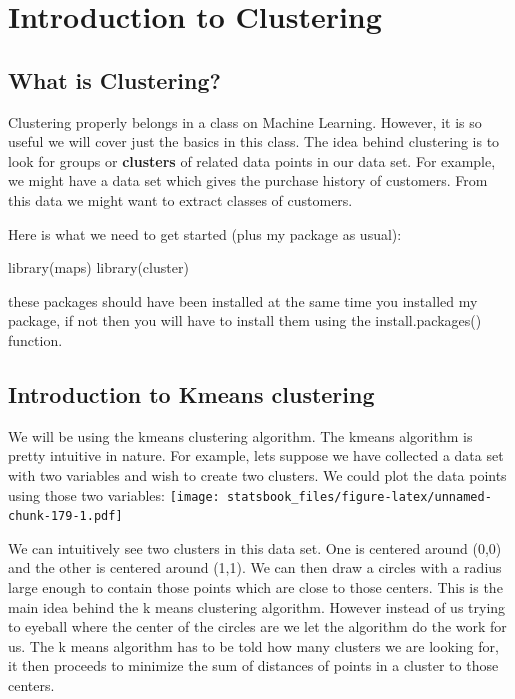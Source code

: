 \documentclass[
]{book}
\newenvironment{Shaded}{\begin{snugshade}}{\end{snugshade}}
\newcommand{\FunctionTok}[1]{\textcolor[rgb]{0.00,0.00,0.00}{#1}}
\newcommand{\NormalTok}[1]{#1}
\theoremstyle{definition}
\theoremstyle{definition}
\theoremstyle{definition}
\theoremstyle{definition}
\theoremstyle{remark}
\begin{document}
\hypertarget{introduction-to-clustering}{%
\chapter{Introduction to Clustering}\label{introduction-to-clustering}}

\hypertarget{what-is-clustering}{%
\section{What is Clustering?}\label{what-is-clustering}}

Clustering properly belongs in a class on Machine Learning. However, it is so useful we will cover just the basics in this class. The idea behind clustering is to look for groups or \textbf{clusters} of related data points in our data set. For example, we might have a data set which gives the purchase history of customers. From this data we might want to extract classes of customers.

Here is what we need to get started (plus my package as usual):

\begin{Shaded}
\begin{Highlighting}[]
\FunctionTok{library}\NormalTok{(maps)}
\FunctionTok{library}\NormalTok{(cluster)}
\end{Highlighting}
\end{Shaded}

these packages should have been installed at the same time you installed my package, if not then you will have to install them using the install.packages() function.

\hypertarget{introduction-to-kmeans-clustering}{%
\section{Introduction to Kmeans clustering}\label{introduction-to-kmeans-clustering}}

We will be using the kmeans clustering algorithm. The kmeans algorithm is pretty intuitive in nature. For example, lets suppose we have collected a data set with two variables and wish to create two clusters. We could plot the data points using those two variables:
\texttt{[image: statsbook\_files/figure-latex/unnamed-chunk-179-1.pdf]}

We can intuitively see two clusters in this data set. One is centered around (0,0) and the other is centered around (1,1). We can then draw a circles with a radius large enough to contain those points which are close to those centers. This is the main idea behind the k means clustering algorithm. However instead of us trying to eyeball where the center of the circles are we let the algorithm do the work for us. The k means algorithm has to be told how many clusters we are looking for, it then proceeds to minimize the sum of distances of points in a cluster to those centers.
\end{document}
